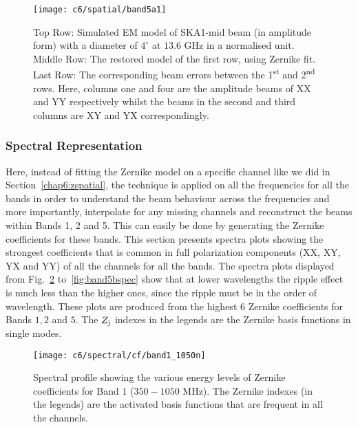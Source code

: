 \begin{figure}
\begin{minipage}[H]{\linewidth}
\centering
\texttt{[image: c6/spatial/band5a1]}
\caption{\label{fig:band5a} Top Row: Simulated EM model of SKA1-mid beam (in amplitude form) with a diameter of $4^\circ$ at  $13.6$ GHz in a normalised unit. Middle Row: The restored model of the first row, using Zernike fit. Last Row: The corresponding beam errors between the 1\textsuperscript{st} and 2\textsuperscript{nd} rows. Here, columns one and four are the amplitude beams of XX and YY respectively whilst the beams in the second and third columns are XY and YX correspondingly.}
\end{minipage}
\end{figure}
\FloatBarrier

\subsubsection{Spectral Representation}	  \label{chap6:zspectral}
%

Here, instead of fitting the Zernike model on a specific channel like we did in Section~\ref{chap6:zspatial}, the technique is applied on all the frequencies for all the  bands in order to understand the beam behaviour across the frequencies and more importantly, interpolate for any missing channels and reconstruct the beams
within Bands 1, 2 and 5. This can easily be done by generating the Zernike coefficients for these bands. This section presents spectra plots showing the strongest coefficients that is common in  full polarization components (XX, XY, YX and YY) of all the channels for all the bands. 
The spectra plots displayed from Fig.~\ref{fig:band1spec} to~\ref{fig:band5bspec} show that at lower wavelengths the ripple effect is much less than the higher ones, since the ripple must be in the order of wavelength. These plots are produced from the highest $6$ Zernike coefficients for Bands $1,2$ and $5$. The $Z_{\rm j}$ indexes in the legends are the Zernike basis functions in single modes. 


\begin{figure}[H]
\centering
\texttt{[image: c6/spectral/cf/band1\_1050n]} %
\caption{\label{fig:band1spec} Spectral profile showing the various energy levels of Zernike coefficients for Band $1$ ($350 - 1050$ MHz).   The Zernike indexes (in the legends) are the activated basis functions that are frequent in all the channels.}
\end{figure}
\FloatBarrier

